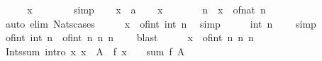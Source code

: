 \begin{isabellebody}
\ \ \isamarkupfalse%
\ \isamarkupfalse%
\ {\isachardoublequoteopen}x\ {\isasymin}\ {\isasymnat}{\isachardoublequoteclose}\isanewline
\ \ \ \ \isamarkupfalse%
\ simp\isanewline
{}\isamarkupfalse%
\isanewline
\ \ \isamarkupfalse%
\ x\ {\isacharcolon}{\kern0pt}{\isacharcolon}{\kern0pt}\ {\isacharprime}{\kern0pt}a\isanewline
\ \ \isamarkupfalse%
\ {\isachardoublequoteopen}x\ {\isasymin}\ {\isasymnat}{\isachardoublequoteclose}\isanewline
\ \ \isamarkupfalse%
\ \isamarkupfalse%
\ n\ \ {\isachardoublequoteopen}x\ {\isacharequal}{\kern0pt}\ of{\isacharunderscore}{\kern0pt}nat\ n{\isachardoublequoteclose}\isanewline
\ \ \ \ \isamarkupfalse%
\ {\isacharparenleft}{\kern0pt}auto\ elim{\isacharbang}{\kern0pt}{\isacharcolon}{\kern0pt}\ Nats{\isacharunderscore}{\kern0pt}cases{\isacharparenright}{\kern0pt}\isanewline
\ \ \isamarkupfalse%
\ \isamarkupfalse%
\ {\isachardoublequoteopen}x\ {\isacharequal}{\kern0pt}\ of{\isacharunderscore}{\kern0pt}int\ {\isacharparenleft}{\kern0pt}int\ n{\isacharparenright}{\kern0pt}{\isachardoublequoteclose}\ \isamarkupfalse%
\ simp\isanewline
\ \ \isamarkupfalse%
\ \isamarkupfalse%
\ {\isachardoublequoteopen}int\ n\ {\isasymge}\ {}{\isachardoublequoteclose}\ \isamarkupfalse%
\ simp\isanewline
\ \ \isamarkupfalse%
\ \isamarkupfalse%
\ {\isachardoublequoteopen}of{\isacharunderscore}{\kern0pt}int\ {\isacharparenleft}{\kern0pt}int\ n{\isacharparenright}{\kern0pt}\ {\isasymin}\ {\isacharbraceleft}{\kern0pt}of{\isacharunderscore}{\kern0pt}int\ n\ {\isacharbar}{\kern0pt}n{\isachardot}{\kern0pt}\ n\ {\isasymge}\ {}{\isacharbraceright}{\kern0pt}{\isachardoublequoteclose}\ \isamarkupfalse%
\ blast\isanewline
\ \ \isamarkupfalse%
\ \isamarkupfalse%
\ {\isachardoublequoteopen}x\ {\isasymin}\ {\isacharbraceleft}{\kern0pt}of{\isacharunderscore}{\kern0pt}int\ n\ {\isacharbar}{\kern0pt}n{\isachardot}{\kern0pt}\ n\ {\isasymge}\ {}{\isacharbraceright}{\kern0pt}{\isachardoublequoteclose}\ \isacommand{{\isachardot}{\kern0pt}}\isamarkupfalse%
\isanewline
{}\isamarkupfalse%
%
\endisatagproof
{\isafoldproof}%
%
\isadelimproof
\isanewline
%
\endisadelimproof
\isanewline
{}\isamarkupfalse%
\isanewline
\isanewline
{}\isamarkupfalse%
\ Ints{\isacharunderscore}{\kern0pt}sum\ {\isacharbrackleft}{\kern0pt}intro{\isacharbrackright}{\kern0pt}{\isacharcolon}{\kern0pt}\ {\isachardoublequoteopen}{\isacharparenleft}{\kern0pt}{\isasymAnd}x{\isachardot}{\kern0pt}\ x\ {\isasymin}\ A\ {\isasymLongrightarrow}\ f\ x\ {\isasymin}\ {\isasymint}{\isacharparenright}{\kern0pt}\ {\isasymLongrightarrow}\ sum\ f\ A\ {\isasymin}\ {\isasymint}{\isachardoublequoteclose}\isanewline

\end{isabellebody}
